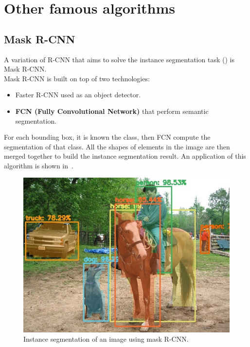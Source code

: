 \section{Other famous algorithms}
\subsection{Mask R-CNN} \label{sec:mask-r-cnn}
A variation of R-CNN that aims to solve the instance segmentation task () is Mask R-CNN\cite{mask-r-cnn}.\\
Mask R-CNN is built on top of two technologies:
\begin{itemize}
	\item Faster R-CNN used as an object detector.
	\item \textbf{FCN (Fully Convolutional Network)}\cite{fcn} that perform semantic segmentation.
\end{itemize}
For each bounding box, it is known the class, then FCN compute the segmentation of that class. All the shapes of elements in the image are then merged together to build the instance segmentation result. An application of this algorithm is shown in~.

\begin{figure}[!h]
	\centering
	\includegraphics[width=0.7\linewidth]{images/detection/ex2_maskRCNN}
	\caption{Instance segmentation of an image using mask R-CNN.}
	\label{fig:ex2_maskRCNN}
\end{figure}


